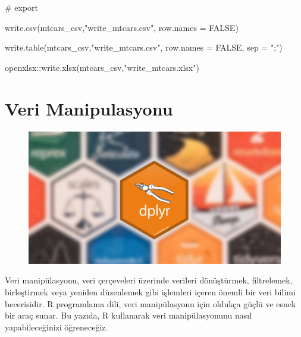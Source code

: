 \documentclass[
  letterpaper,
  DIV=11,
  numbers=noendperiod]{scrreprt}
\newenvironment{Shaded}{\begin{snugshade}}{\end{snugshade}}
\newcommand{\AttributeTok}[1]{\textcolor[rgb]{0.40,0.45,0.13}{#1}}
\newcommand{\CommentTok}[1]{\textcolor[rgb]{0.37,0.37,0.37}{#1}}
\newcommand{\ConstantTok}[1]{\textcolor[rgb]{0.56,0.35,0.01}{#1}}
\newcommand{\FunctionTok}[1]{\textcolor[rgb]{0.28,0.35,0.67}{#1}}
\newcommand{\NormalTok}[1]{\textcolor[rgb]{0.00,0.23,0.31}{#1}}
\newcommand{\SpecialCharTok}[1]{\textcolor[rgb]{0.37,0.37,0.37}{#1}}
\newcommand{\StringTok}[1]{\textcolor[rgb]{0.13,0.47,0.30}{#1}}
\begin{document}
\begin{Shaded}
\begin{Highlighting}[]
\CommentTok{\# export}

\FunctionTok{write.csv}\NormalTok{(mtcars\_csv,}\StringTok{"write\_mtcars.csv"}\NormalTok{,}
          \AttributeTok{row.names =} \ConstantTok{FALSE}\NormalTok{)}

\FunctionTok{write.table}\NormalTok{(mtcars\_csv,}\StringTok{"write\_mtcars.csv"}\NormalTok{,}
            \AttributeTok{row.names =} \ConstantTok{FALSE}\NormalTok{,}
            \AttributeTok{sep =} \StringTok{";"}\NormalTok{)}

\NormalTok{openxlsx}\SpecialCharTok{::}\FunctionTok{write.xlsx}\NormalTok{(mtcars\_csv,}\StringTok{"write\_mtcars.xlsx"}\NormalTok{)}
\end{Highlighting}
\end{Shaded}


\hypertarget{part-manipulation}{%
\chapter*{Veri Manipulasyonu}\label{part-manipulation}}


\begin{figure}

{\centering \includegraphics[width=5.15625in,height=\textheight]{images/dplyr2.jpg}

}

\end{figure}

Veri manipülasyonu, veri çerçeveleri üzerinde verileri dönüştürmek,
filtrelemek, birleştirmek veya yeniden düzenlemek gibi işlemleri içeren
önemli bir veri bilimi becerisidir. R programlama dili, veri
manipülasyonu için oldukça güçlü ve esnek bir araç sunar. Bu yazıda, R
kullanarak veri manipülasyonunu nasıl yapabileceğinizi öğreneceğiz.
\end{document}

